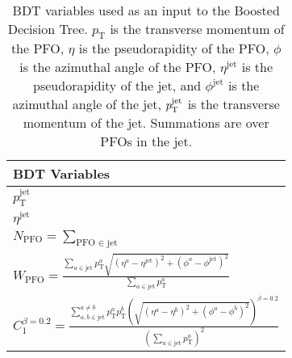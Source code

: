 \begin{table}[!htb]
    \centering
    \caption{BDT variables used as an input to the Boosted Decision Tree. $p_\mathrm{T}$ is the transverse momentum of the PFO, $\eta$ is the pseudorapidity of the PFO, $\phi$ is the azimuthal angle of the PFO,  $\eta^{\text{jet}}$ is the pseudorapidity of the jet, and $\phi^{\text{jet}}$ is the azimuthal angle of the jet, $p_\text{T}^\mathrm{jet}$ is the transverse momentum of the jet. Summations are over PFOs in the jet. \cite{bdt_tag}}
    \label{tab:bdt_variables}
    \begin{tabular}{l}
    \toprule
        BDT Variables \\
    \midrule
        $p_\mathrm{T}^\mathrm{jet}$ \\
        $\eta^\mathrm{jet}$ \\
        \vspace{1em}
        $N_{\text {PFO}}=\sum_{\text {PFO } \in \text { jet }}$ \\
        \vspace{1em}
        $W_{\text {PFO}}=\frac{\sum_{a \in \mathrm{jet}} p_{\mathrm{T}}^{a} \sqrt{(\eta^a - \eta^{\text{jet}})^2 + (\phi^a - \phi^{\text{jet}})^2}}{\sum_{a \in \mathrm{jet}} p_{\mathrm{T}}^{a}}$ \\
        \vspace{1em}
        $C_1^{\beta=0.2}=\frac{\sum_{a, b \in \mathrm{jet}}^{a \neq b} p_{\mathrm{T}}^a p_{\mathrm{T}}^b \left(\sqrt{(\eta^a - \eta^b)^2 + (\phi^a - \phi^b)^2}\right)^{\beta=0.2}}{\left(\sum_{a \in \mathrm{jet}} p_{\mathrm{T}}^{a}\right)^2}$ \\
    \bottomrule
    \end{tabular}
\end{table}
    